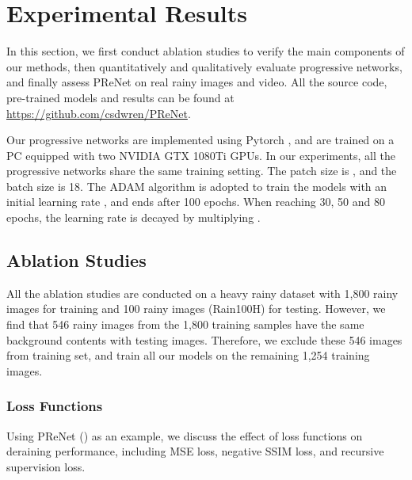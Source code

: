 \documentclass[10pt,twocolumn,letterpaper]{article}
\begin{document}
\section{Experimental Results}

In this section, we first conduct ablation studies to verify the main components of our methods, then quantitatively and qualitatively evaluate progressive networks, and finally assess PReNet on real rainy images and video.
All the source code, pre-trained models and results can be found at \url{https://github.com/csdwren/PReNet}.


Our progressive networks are implemented using Pytorch \cite{paszke2017automatic}, and are trained on a PC equipped with two NVIDIA GTX 1080Ti GPUs.
In our experiments, all the progressive networks share the same training setting.
The patch size is , and the batch size is 18.
The ADAM \cite{kingma2014adam} algorithm is adopted to train the models with an initial learning rate , and ends after 100 epochs.
When reaching 30, 50 and 80 epochs, the learning rate is decayed by multiplying .







\subsection{Ablation Studies}
All the ablation studies are conducted on a heavy rainy dataset \cite{yang2017deep} with 1,800 rainy images for training and 100 rainy images (Rain100H) for testing.
However, we find that 546 rainy images from the 1,800 training samples have the same background contents with testing images.
Therefore, we exclude these 546 images from training set, and train all our models on the remaining 1,254 training images.


\subsubsection{Loss Functions}\label{sec:training loss}
Using PReNet () as an example, we discuss the effect of loss functions on deraining performance, including MSE loss, negative SSIM loss, and recursive supervision loss.
\end{document}
